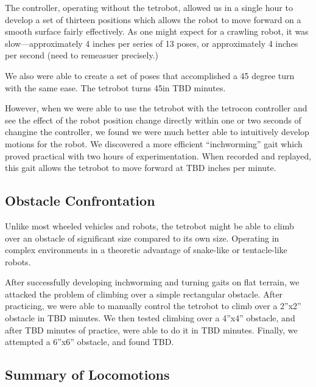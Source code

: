 \documentclass[conference]{article}
\begin{document}
 The controller, operating without the tetrobot,
 allowed us in a single hour to develop a set
 of thirteen positions which allows the robot to move forward
 on a smooth surface fairly effectively. As one might expect
 for a crawling robot, it was slow---approximately 4 inches
 per series of 13 poses, or approximately 4 inches per second
 (need to remeasuer precisely.)

 We also were able to create a set of poses that accomplished
 a 45 degree turn with the same ease. The tetrobot turns 45\degree in
 TBD minutes.

 However, when we were able to use the tetrobot with the tetrocon
 controller and see the effect of the robot position change directly
 within one or two seconds of changine the controller, we found we
 were much better able to intuitively develop motions for the robot.
 We discovered a more efficient ``inchworming'' gait which proved
 practical with two hours of experimentation. When recorded and
 replayed, this gait allows the tetrobot to move forward at TBD
 inches per minute.

 \subsection{Obstacle Confrontation}

 Unlike most wheeled vehicles and robots, the tetrobot might be able
 to climb over an obstacle of significant size compared to
 its own size. Operating in complex environments in a theoretic
 advantage of snake-like or tentacle-like robots.

 After successfully developing inchworming and turning gaits on
 flat terrain, we attacked the problem of climbing over a simple rectangular
 obstacle.  After practicing, we were able to manually control the
 tetrobot to climb over a 2''x2'' obstacle in TBD minutes. We then
 tested climbing over a 4''x4'' obstacle, and after TBD minutes of practice,
 were able to do it in TBD minutes. Finally, we attempted a 6''x6'' obstacle,
 and found TBD.

 \subsection{Summary of Locomotions}
\end{document}
